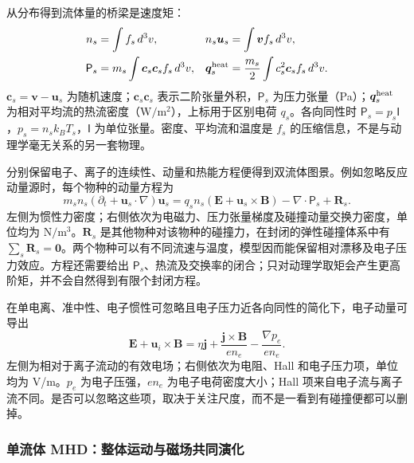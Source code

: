 \documentclass[12pt,fontset=none]{ctexart}
\numberwithin{equation}{section}
\numberwithin{table}{section}
\numberwithin{figure}{section}
\begin{document}
从分布得到流体量的桥梁是速度矩\cite{Pmoments}：
\begin{equation}\label{eq:micro-moments}
 \begin{aligned}
 n_s&=\int f_s\,d^3v,& n_s\bm u_s&=\int\bm v f_s\,d^3v,\\
 \mathsf P_s&=m_s\int\bm c_s\bm c_s f_s\,d^3v,&
 \bm q_s^{\rm heat}&=\frac{m_s}{2}\int c_s^2\bm c_s f_s\,d^3v.
 \end{aligned}
\end{equation}
$\bm c_s=\bm v-\bm u_s$ 为随机速度；$\bm c_s\bm c_s$ 表示二阶张量外积，$\mathsf P_s$ 为压力张量（Pa）；$\bm q_s^{\rm heat}$ 为相对平均流的热流密度（$\mathrm{W/m^2}$），上标用于区别电荷 $q_s$。各向同性时 $\mathsf P_s=p_s\mathsf I$，$p_s=n_sk_BT_s$，$\mathsf I$ 为单位张量。密度、平均流和温度是 $f_s$ 的压缩信息，不是与动理学毫无关系的另一套物理。

分别保留电子、离子的连续性、动量和热能方程便得到双流体图景。例如忽略反应动量源时，每个物种的动量方程为
\begin{equation}\label{eq:micro-twofluid}
 m_sn_s(\partial_t+\bm u_s\cdot\nabla)\bm u_s
 =q_sn_s(\bm E+\bm u_s\times\bm B)-\nabla\cdot\mathsf P_s+\bm R_s.
\end{equation}
左侧为惯性力密度；右侧依次为电磁力、压力张量梯度及碰撞动量交换力密度，单位均为 $\mathrm{N/m^3}$。$\bm R_s$ 是其他物种对该物种的碰撞力，在封闭的弹性碰撞体系中有 $\sum_s\bm R_s=\bm0$。两个物种可以有不同流速与温度，模型因而能保留相对漂移及电子压力效应。方程还需要给出 $\mathsf P_s$、热流及交换率的闭合；只对动理学取矩会产生更高阶矩，并不会自然得到有限个封闭方程。

在单电离、准中性、电子惯性可忽略且电子压力近各向同性的简化下，电子动量可导出
\begin{equation}\label{eq:micro-generalohm}
 \bm E+\bm u_i\times\bm B
 =\eta\bm j+\frac{\bm j\times\bm B}{en_e}
 -\frac{\nabla p_e}{en_e}.
\end{equation}
左侧为相对于离子流动的有效电场；右侧依次为电阻、Hall 和电子压力项，单位均为 V/m。$p_e$ 为电子压强，$en_e$ 为电子电荷密度大小；Hall 项来自电子流与离子流不同。是否可以忽略这些项，取决于关注尺度，而不是一看到有碰撞便都可以删掉。

\subsubsection{单流体 MHD：整体运动与磁场共同演化}
\end{document}
